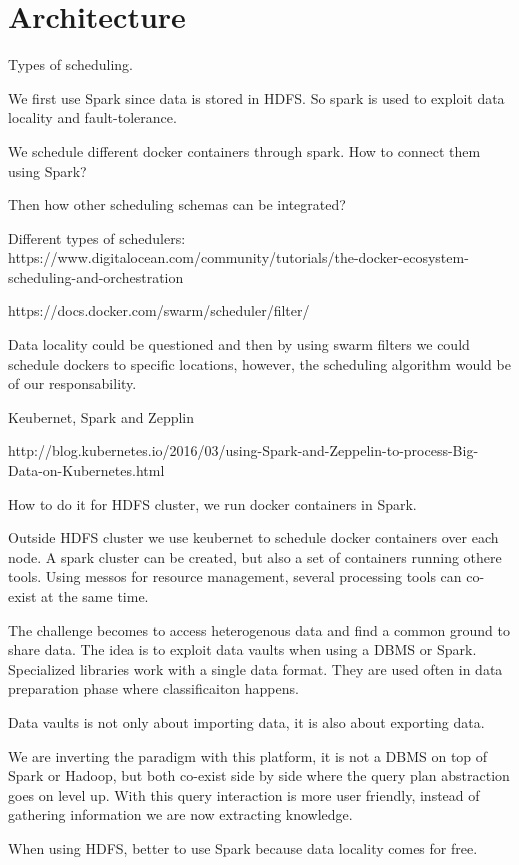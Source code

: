 \section{Architecture}
\label{architecture}

Types of scheduling.

We first use Spark since data is stored in HDFS.
So spark is used to exploit data locality and fault-tolerance.


We schedule different docker containers through spark.
How to connect them using Spark?

Then how other scheduling schemas can be integrated?

Different types of schedulers:
https://www.digitalocean.com/community/tutorials/the-docker-ecosystem-scheduling-and-orchestration

https://docs.docker.com/swarm/scheduler/filter/

Data locality could be questioned and then by using swarm filters we could schedule dockers to
specific locations, however, the scheduling algorithm would be of our responsability.

Keubernet, Spark and Zepplin

http://blog.kubernetes.io/2016/03/using-Spark-and-Zeppelin-to-process-Big-Data-on-Kubernetes.html


How to do it for HDFS cluster, we run docker containers in Spark.

Outside HDFS cluster we use keubernet to schedule docker containers over each node.
A spark cluster can be created, but also a set of containers running othere tools.
Using messos for resource management, several processing tools can co-exist at the same time.

The challenge becomes to access heterogenous data and find a common ground to share data.
The idea is to exploit data vaults when using a DBMS or Spark. Specialized libraries work
with a single data format. They are used often in data preparation phase where classificaiton happens.

Data vaults is not only about importing data, it is also about exporting data.

We are inverting the paradigm with this platform, it is not a DBMS on top of Spark or Hadoop, but both co-exist side by side
where the query plan abstraction goes on level up. With this query interaction is more user friendly, instead of gathering
information we are now extracting knowledge.

When using HDFS, better to use Spark because data locality comes for free.


